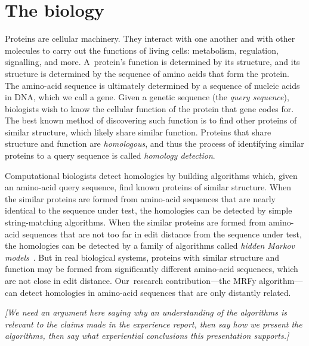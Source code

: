 \documentclass[preprint,nonatbib,blockstyle,nocopyrightspace,times]{sigplanconf}
\let\cite\citep
\begin{document}
\section{The biology}

Proteins are cellular machinery. They interact with one another and with other 
molecules to carry out the functions of living cells: metabolism, regulation, 
signalling, and more.
A~protein's function is determined by its structure, 
and its structure is determined by the sequence of amino acids that
form the protein.
The amino-acid sequence is ultimately determined by a sequence of
nucleic acids in DNA, which we call a gene.
Given a genetic sequence (the \textit{query sequence}), biologists wish to know the cellular
function of the protein that gene codes for.
The best known method of discovering such function is
to find other proteins of 
similar structure, which likely share similar function.
Proteins that share structure and function are \textit{homologous}, and thus
the process of identifying similar proteins to a query sequence is called 
\textit{homology detection}.




Computational biologists detect homologies by building 
algorithms which, given an amino-acid query sequence,
find known proteins of similar structure.
When the similar proteins are formed from amino-acid sequences that
are nearly identical to the sequence under test, the homologies can be
detected by  
simple string-matching algorithms.
When the similar proteins are formed from amino-acid sequences that
are not too far in edit distance from the sequence under test, the homologies can be
detected by
a family of algorithms called 
\textit{hidden Markov models}~\cite{hmmer}.
But in real biological systems,
proteins with similar structure and function may be formed from significantly 
different amino-acid sequences, which are not close in edit distance.
Our~research contribution---the MRFy algorithm---can detect homologies
in amino-acid sequences that are only distantly related.
%

\emph{[We need an argument here saying why an understanding of the
    algorithms is relevant to the claims made in the experience
    report, then say how we present the algorithms, then say what
    experiential conclusions this presentation supports.]}
\end{document}
